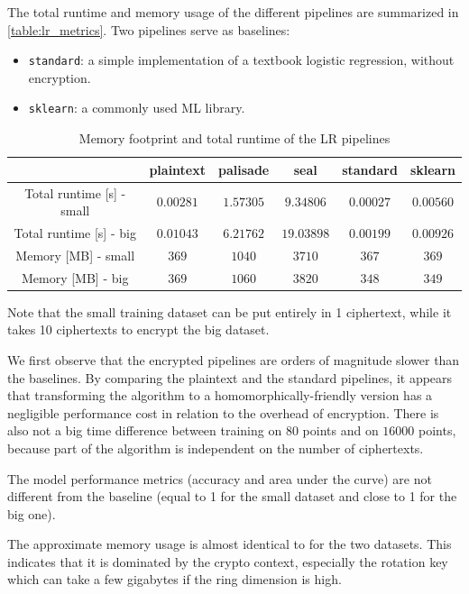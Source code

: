 \documentclass[a4paper,11pt,oneside]{report}
\begin{document}
The total runtime and memory usage of the different pipelines are summarized in \autoref{table:lr_metrics}. 
Two pipelines serve as baselines:
\begin{itemize}
  \item \texttt{standard}: a simple implementation of a textbook logistic regression, without encryption.
  \item \texttt{sklearn}: a commonly used ML library.
\end{itemize}

\begin{table}[h!]
  \begin{center}
    \caption{Memory footprint and total runtime of the LR pipelines}
    \label{table:lr_metrics}
    \begin{tabular}{ c c c c c c }
    \hline
     & plaintext & palisade & seal & standard & sklearn \\
    \hline
    Total runtime [s] - small & $0.00281$ & $1.57305$ & $9.34806$ & $0.00027$ & $0.00560$ \\
    Total runtime [s] - big & $0.01043$ & $6.21762$ & $19.03898$ & $0.00199$ & $0.00926$ \\
    Memory [MB] - small & $369$ & $1040$ & $3710$ & $367$ & $369$ \\
    Memory [MB] - big & $369$ & $1060$ & $3820$ & $348$ & $349$ \\
    \hline
    \end{tabular}
  \end{center}
\end{table}

Note that the small training dataset can be put entirely in 1 ciphertext, while it takes 10 ciphertexts to encrypt the big dataset.

We first observe that the encrypted pipelines are orders of magnitude slower than the baselines.
By comparing the plaintext and the standard pipelines, it appears that transforming the algorithm to a homomorphically-friendly version has a negligible performance cost in relation to the overhead of encryption.
There is also not a big time difference between training on $80$ points and on $16000$ points, because part of the algorithm is independent on the number of ciphertexts.

The model performance metrics (accuracy and area under the curve) are not different from the baseline (equal to 1 for the small dataset and close to 1 for the big one).

The approximate memory usage is almost identical to for the two datasets.
This indicates that it is dominated by the crypto context, especially the rotation key which can take a few gigabytes if the ring dimension is high. 
\end{document}
